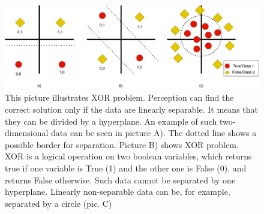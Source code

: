 \begin{figure}[ht]
\centering
\includegraphics[width=0.6\columnwidth]{../img/xor}
\caption{This picture illustrates XOR problem. Perception can find the correct solution only if the data are linearly separable. It means that they can be divided by a hyperplane. An example of such two-dimensional data can be seen in picture A). The dotted line shows a possible border for separation. Picture B) shows XOR problem. XOR is a logical operation on two boolean variables, which returns true if one variable is True (1) and the other one is False (0), and returns False otherwise. Such data cannot be separated by one hyperplane. Linearly non-separable data can be, for example, separated by a circle (pic. C)}
\label{pic:xor}
\end{figure}

